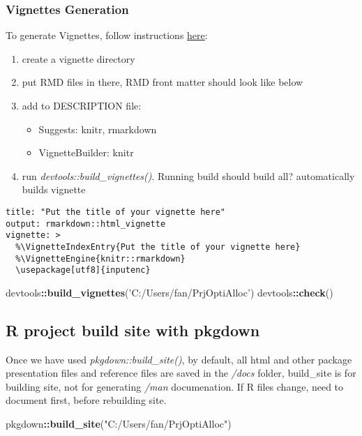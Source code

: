 \documentclass[
]{article}
\newenvironment{Shaded}{\begin{snugshade}}{\end{snugshade}}
\newcommand{\KeywordTok}[1]{\textcolor[rgb]{0.13,0.29,0.53}{\textbf{#1}}}
\newcommand{\NormalTok}[1]{#1}
\newcommand{\OperatorTok}[1]{\textcolor[rgb]{0.81,0.36,0.00}{\textbf{#1}}}
\newcommand{\StringTok}[1]{\textcolor[rgb]{0.31,0.60,0.02}{#1}}
\providecommand{\tightlist}{%
  \setlength{\itemsep}{0pt}\setlength{\parskip}{0pt}}
\begin{document}
\hypertarget{vignettes-generation}{%
\subsubsection{Vignettes Generation}\label{vignettes-generation}}

To generate Vignettes, follow instructions
\href{https://kbroman.org/pkg_primer/pages/vignettes.html}{here}:

\begin{enumerate}
\def\labelenumi{\arabic{enumi}.}
\tightlist
\item
  create a vignette directory
\item
  put RMD files in there, RMD front matter should look like below
\item
  add to DESCRIPTION file:

  \begin{itemize}
  \tightlist
  \item
    Suggests: knitr, rmarkdown
  \item
    VignetteBuilder: knitr
  \end{itemize}
\item
  run \emph{devtools::build\_vignettes()}. Running build should build
  all? automatically builds vignette
\end{enumerate}

\begin{verbatim}
title: "Put the title of your vignette here"
output: rmarkdown::html_vignette
vignette: >
  %\VignetteIndexEntry{Put the title of your vignette here}
  %\VignetteEngine{knitr::rmarkdown}
  \usepackage[utf8]{inputenc}
\end{verbatim}

\begin{Shaded}
\begin{Highlighting}[]
\NormalTok{devtools}\OperatorTok{::}\KeywordTok{build_vignettes}\NormalTok{(}\StringTok{'C:/Users/fan/PrjOptiAlloc'}\NormalTok{)}
\NormalTok{devtools}\OperatorTok{::}\KeywordTok{check}\NormalTok{()}
\end{Highlighting}
\end{Shaded}

\hypertarget{r-project-build-site-with-pkgdown}{%
\subsection{R project build site with
pkgdown}\label{r-project-build-site-with-pkgdown}}

Once we have used \emph{pkgdown::build\_site()}, by default, all html
and other package presentation files and reference files are saved in
the \emph{/docs} folder, build\_site is for building site, not for
generating \emph{/man} documenation. If R files change, need to document
first, before rebuilding site.

\begin{Shaded}
\begin{Highlighting}[]
\NormalTok{pkgdown}\OperatorTok{::}\KeywordTok{build_site}\NormalTok{(}\StringTok{"C:/Users/fan/PrjOptiAlloc"}\NormalTok{)}
\end{Highlighting}
\end{Shaded}
\end{document}
